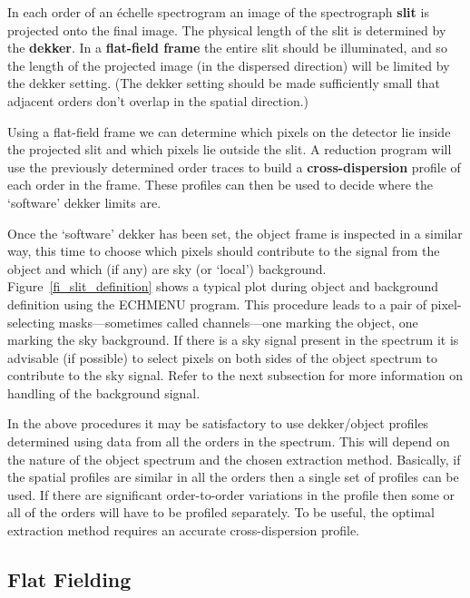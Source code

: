\documentclass[twoside,11pt]{article}
\newcommand{\htmlref}[2]{#1}
\newcommand{\xlabel}[1]{}
\newcommand{\sgspec}[2]{#1}
\newcommand{\sgspec}[2]{#2}
\begin{document}
In each order of an \'{e}chelle spectrogram an image of the spectrograph
\htmlref{{\bf slit}}{gl_slit}
is projected onto the final image.  The physical length of the slit
is determined by the \htmlref{{\bf dekker}}{gl_dekker}.
In a \htmlref{{\bf flat-field frame}}{gl_flat_field} the entire slit should
be illuminated, and so the length of the projected image (in the dispersed
direction) will be limited by the dekker setting.
(The dekker setting should be made sufficiently small
that adjacent orders don't overlap in the spatial direction.)

Using a flat-field frame we can determine which pixels on the detector lie
inside the projected slit and which pixels lie outside the slit.  A
reduction program will use the previously determined order traces to build
a \htmlref{{\bf cross-dispersion}}{gl_cross_dispersion} profile of each
order in the frame.
These profiles can then be used to decide where the `software' dekker
limits are.

Once the `software' dekker has been set, the object frame is inspected in a
similar way, this time to choose which pixels should contribute to the
signal from the object and which (if any) are sky (or `local') background.
\sgspec{Figure~\ref{fi_slit_definition}}{The figure above} shows a typical
plot during object and background definition using the ECHMENU program.
This procedure leads to a pair of pixel-selecting
masks\sgspec{---}{ - }sometimes called
channels\sgspec{---}{ - }one marking the object, one marking the sky background.
If there is a sky signal
present in the spectrum it is advisable (if possible) to select pixels on
both sides of the object spectrum to contribute to the sky signal.
Refer to the next subsection for more information on handling of the
background signal.

In the above procedures it may be satisfactory to use dekker/object profiles
determined using data from all the orders in the spectrum.  This will
depend on the nature of the object spectrum and the chosen extraction
method.  Basically, if the spatial profiles are similar in all the orders
then a
single set of profiles can be used.  If there are significant order-to-order
variations in the profile then some or all of the orders will have to be
profiled separately.  To be useful, the optimal extraction method requires
an accurate cross-dispersion profile.


\subsection{\label{se_flat_fields}\xlabel{flat_fields}Flat Fielding}
\end{document}
